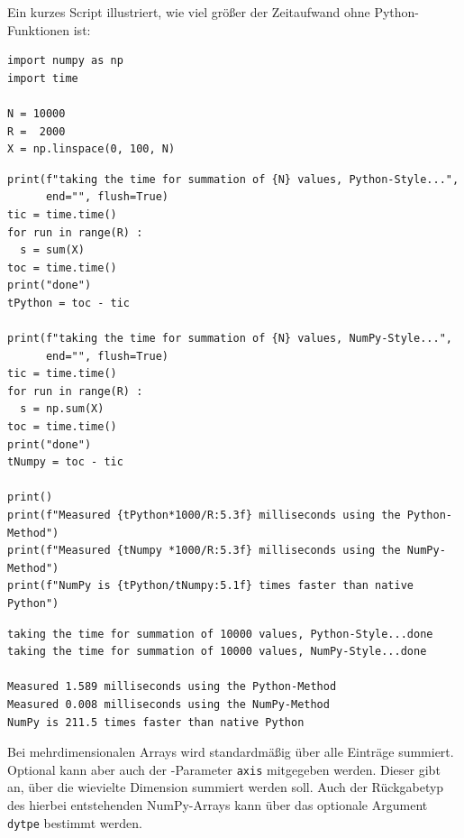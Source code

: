Ein kurzes Script illustriert, wie viel größer der Zeitaufwand ohne Python-Funktionen ist:

\begin{codebox}
\begin{verbatim}
import numpy as np
import time

N = 10000
R =  2000
X = np.linspace(0, 100, N)
\end{verbatim}
\end{codebox}
%
\begin{codebox}[]
\begin{verbatim}
print(f"taking the time for summation of {N} values, Python-Style...",
      end="", flush=True)
tic = time.time()
for run in range(R) :
  s = sum(X)
toc = time.time()
print("done")
tPython = toc - tic

print(f"taking the time for summation of {N} values, NumPy-Style...",
      end="", flush=True)
tic = time.time()
for run in range(R) :
  s = np.sum(X)
toc = time.time()
print("done")
tNumpy = toc - tic

print()
print(f"Measured {tPython*1000/R:5.3f} milliseconds using the Python-Method")
print(f"Measured {tNumpy *1000/R:5.3f} milliseconds using the NumPy-Method")
print(f"NumPy is {tPython/tNumpy:5.1f} times faster than native Python")
\end{verbatim}
\end{codebox}
%
\begin{cmdbox}
\begin{verbatim}
taking the time for summation of 10000 values, Python-Style...done
taking the time for summation of 10000 values, NumPy-Style...done

Measured 1.589 milliseconds using the Python-Method
Measured 0.008 milliseconds using the NumPy-Method
NumPy is 211.5 times faster than native Python
\end{verbatim}
\end{cmdbox}

Bei mehrdimensionalen Arrays wird standardmäßig über alle Einträge summiert. Optional kann aber auch der -Parameter \texttt{axis} mitgegeben werden. Dieser gibt an, über die wievielte Dimension summiert werden soll. Auch der Rückgabetyp des hierbei entstehenden NumPy-Arrays kann über das optionale Argument \texttt{dytpe} bestimmt werden.

